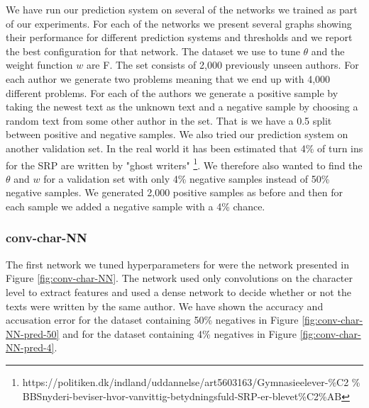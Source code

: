 We have run our prediction system on several of the networks we trained as
part of our experiments. For each of the networks we present several graphs
showing their performance for different prediction systems and thresholds and
we report the best configuration for that network. The dataset we use to tune
$\theta$ and the weight function $w$ are \gls{F}. The set consists of 2,000
previously unseen authors. For each author we generate two problems meaning that
we end up with 4,000 different problems. For each of the authors we generate a
positive sample by taking the newest text as the unknown text and a negative
sample by choosing a random text from some other author in the set. That is
we have a 0.5 split between positive and negative samples. We also tried our
prediction system on another validation set. In the real world it has been
estimated that 4\% of turn ins for the \gls{SRP} are written by "ghost writers"
\footnote{https://politiken.dk/indland/uddannelse/art5603163/Gymnasieelever-\%C2
\% BBSnyderi-beviser-hvor-vanvittig-betydningsfuld-SRP-er-blevet\%C2\%AB}. We
therefore also wanted to find the $\theta$ and $w$ for a validation set with
only 4\% negative samples instead of 50\% negative samples. We generated 2,000
positive samples as before and then for each sample we added a negative sample
with a 4\% chance.


\subsubsection{\glsdesc{conv-char-NN}}
\label{subsubsec:prediction_system_conv-char-NN}

The first network we tuned hyperparameters for were the network presented
in Figure \ref{fig:conv-char-NN}. The network used only convolutions on the
character level to extract features and used a dense network to decide whether
or not the texts were written by the same author. We have shown the accuracy
and accusation error for the dataset containing 50\% negatives in Figure
\ref{fig:conv-char-NN-pred-50} and for the dataset containing 4\% negatives in
Figure \ref{fig:conv-char-NN-pred-4}.

